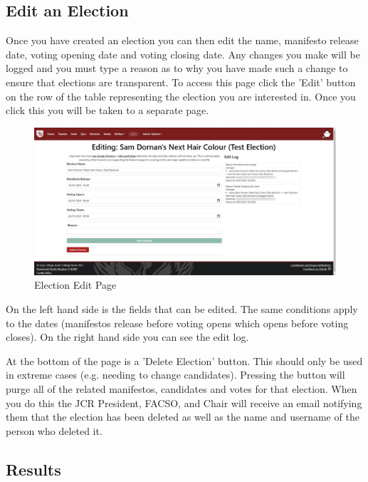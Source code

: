 \documentclass{article}
\begin{document}
\subsection{Edit an Election}
Once you have created an election you can then edit the name, manifesto release date, voting opening date and voting closing date. Any changes you make will be logged and you must type a reason as to why you have made such a change to ensure that elections are transparent. To access this page click the 'Edit' button on the row of the table representing the election you are interested in. Once you click this you will be taken to a separate page.
\begin{figure}[H]
    \centering
    \includegraphics[width=\textwidth,height=\textheight,keepaspectratio]{elections/election_edit.png}
    \caption{Election Edit Page}
    \label{fig:election_edit}
\end{figure}
On the left hand side is the fields that can be edited. The same conditions apply to the dates (manifestos release before voting opens which opens before voting closes). On the right hand side you can see the edit log.

At the bottom of the page is a 'Delete Election' button. This should only be used in extreme cases (e.g. needing to change candidates). Pressing the button will purge all of the related manifestos, candidates and votes for that election. When you do this the JCR President, FACSO, and Chair will receive an email notifying them that the election has been deleted as well as the name and username of the person who deleted it.
\subsection{Results}
\end{document}
